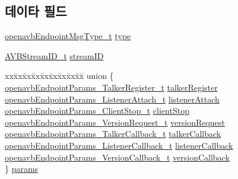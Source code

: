\subsection*{데이타 필드}
\begin{DoxyCompactItemize}
\item 
\hyperlink{openavb__endpoint_8h_a462f9660ca482a40ad5a10d88cc7b5aa}{openavb\+Endpoint\+Msg\+Type\+\_\+t} \hyperlink{structopenavb_endpoint_message__t_aafa5465615d5d57894a9aff52a0b8bbe}{type}
\item 
\hyperlink{struct_a_v_b_stream_i_d__t}{A\+V\+B\+Stream\+I\+D\+\_\+t} \hyperlink{structopenavb_endpoint_message__t_a989c1ccd88811e9926203a07d587bc21}{stream\+ID}
\item 
\begin{tabbing}
xx\=xx\=xx\=xx\=xx\=xx\=xx\=xx\=xx\=\kill
union \{\\
\>\hyperlink{structopenavb_endpoint_params___talker_register__t}{openavbEndpointParams\_TalkerRegister\_t} \hyperlink{structopenavb_endpoint_message__t_a7f36562324158a4db2e4c85fb16cd024}{talkerRegister}\\
\>\hyperlink{structopenavb_endpoint_params___listener_attach__t}{openavbEndpointParams\_ListenerAttach\_t} \hyperlink{structopenavb_endpoint_message__t_ac2e82dfe27ccc817c57d5a7f5e79f1f8}{listenerAttach}\\
\>\hyperlink{structopenavb_endpoint_params___client_stop__t}{openavbEndpointParams\_ClientStop\_t} \hyperlink{structopenavb_endpoint_message__t_aa24b52f242f6562d6dcc6e1582aafbf2}{clientStop}\\
\>\hyperlink{structopenavb_endpoint_params___version_request__t}{openavbEndpointParams\_VersionRequest\_t} \hyperlink{structopenavb_endpoint_message__t_a4050d2656eb200835a4ad0ac0042b66f}{versionRequest}\\
\>\hyperlink{structopenavb_endpoint_params___talker_callback__t}{openavbEndpointParams\_TalkerCallback\_t} \hyperlink{structopenavb_endpoint_message__t_a37c4a21a8e0736f390b17502d9b87953}{talkerCallback}\\
\>\hyperlink{structopenavb_endpoint_params___listener_callback__t}{openavbEndpointParams\_ListenerCallback\_t} \hyperlink{structopenavb_endpoint_message__t_ac8761c443d9ab872ae9eb7d05dfe263c}{listenerCallback}\\
\>\hyperlink{structopenavb_endpoint_params___version_callback__t}{openavbEndpointParams\_VersionCallback\_t} \hyperlink{structopenavb_endpoint_message__t_af1e57319836a16cab8a638539c98b8fc}{versionCallback}\\
\} \hyperlink{structopenavb_endpoint_message__t_a3323444c032143b0097535d365e2cbd9}{params}\\

\end{tabbing}\end{DoxyCompactItemize}


